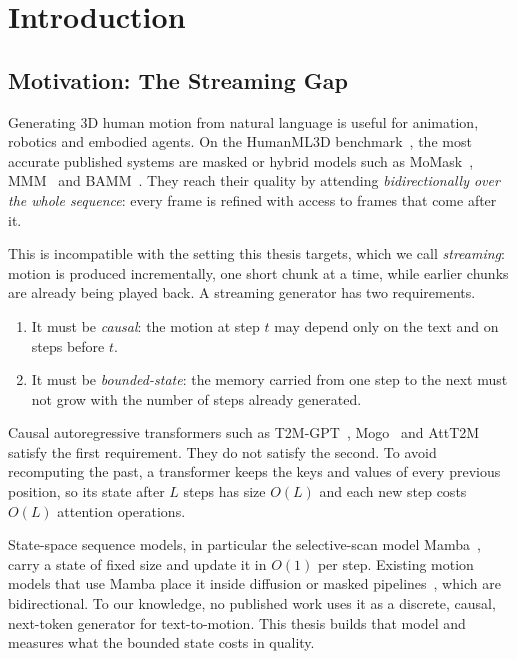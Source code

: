 \chapter{Introduction}
\label{chap:introduction}

\section{Motivation: The Streaming Gap}
\label{sec:intro_motivation}

Generating 3D human motion from natural language is useful for animation, robotics and embodied agents. On the HumanML3D benchmark~\cite{guo2022humanml3d}, the most accurate published systems are masked or hybrid models such as MoMask~\cite{guo2024momask}, MMM~\cite{pinyoanuntapong2023mmm} and BAMM~\cite{pinyoanuntapong2024bamm}. They reach their quality by attending \emph{bidirectionally over the whole sequence}: every frame is refined with access to frames that come after it.

This is incompatible with the setting this thesis targets, which we call \emph{streaming}: motion is produced incrementally, one short chunk at a time, while earlier chunks are already being played back. A streaming generator has two requirements.

\begin{enumerate}
\item It must be \emph{causal}: the motion at step $t$ may depend only on the text and on steps before $t$.
\item It must be \emph{bounded-state}: the memory carried from one step to the next must not grow with the number of steps already generated.
\end{enumerate}

Causal autoregressive transformers such as T2M-GPT~\cite{zhang2023t2mgpt}, Mogo~\cite{fu2024mogo} and AttT2M~\cite{zhong2023attt2m} satisfy the first requirement. They do not satisfy the second. To avoid recomputing the past, a transformer keeps the keys and values of every previous position, so its state after $L$ steps has size $O(L)$ and each new step costs $O(L)$ attention operations.

State-space sequence models, in particular the selective-scan model Mamba~\cite{gu2023mamba}, carry a state of fixed size and update it in $O(1)$ per step. Existing motion models that use Mamba place it inside diffusion or masked pipelines~\cite{zhang2024motionmamba,zhang2024kmm,zhan2026t2mmamba}, which are bidirectional. To our knowledge, no published work uses it as a discrete, causal, next-token generator for text-to-motion. This thesis builds that model and measures what the bounded state costs in quality.

